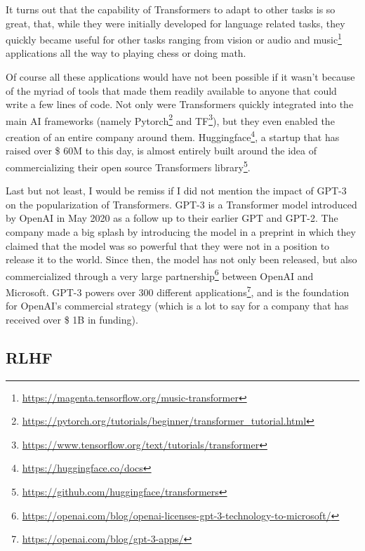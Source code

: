 \documentclass{article}
\begin{document}
It turns out that the capability of Transformers to adapt to other tasks is so great, that, while they were initially developed for language related tasks, they quickly became useful for other tasks ranging from vision\cite{khan2022transformers} or audio and music\footnote{\url{https://magenta.tensorflow.org/music-transformer}} applications all the way to playing chess\cite{noever2020chess} or doing math\cite{noorbakhsh2021pretrained}.

Of course all these applications would have not been possible if it wasn’t because of the myriad of tools that made them readily available to anyone that could write a few lines of code. Not only were Transformers quickly integrated into the main AI frameworks (namely Pytorch\footnote{\url{https://pytorch.org/tutorials/beginner/transformer_tutorial.html}} and TF\footnote{\url{https://www.tensorflow.org/text/tutorials/transformer}}), but they even enabled the creation of an entire company around them. Huggingface\footnote{\url{https://huggingface.co/docs}}, a startup that has raised over \$ 60M to this day, is almost entirely built around the idea of commercializing their open source Transformers library\footnote{\url{https://github.com/huggingface/transformers}}.

Last but not least, I would be remiss if I did not mention the impact of GPT-3\cite{brown2020language} on the popularization of Transformers. GPT-3 is a Transformer model introduced by OpenAI in May 2020 as a follow up to their earlier GPT and GPT-2. The company made a big splash by introducing the model in a preprint\cite{brown2020language} in which they claimed that the model was so powerful that they were not in a position to release it to the world. Since then, the model has not only been released, but also commercialized through a very large partnership\footnote{\url{https://openai.com/blog/openai-licenses-gpt-3-technology-to-microsoft/}} between OpenAI and Microsoft. GPT-3 powers over 300 different applications\footnote{\url{https://openai.com/blog/gpt-3-apps/}}, and is the foundation for OpenAI’s commercial strategy (which is a lot to say for a company that has received over \$ 1B in funding).

\subsection{RLHF}
\end{document}
